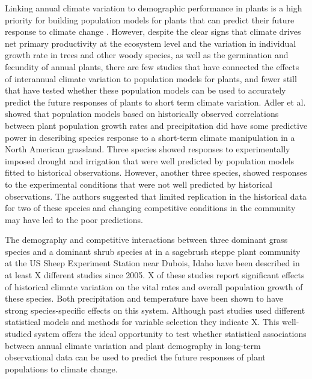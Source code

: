 \documentclass[11pt]{article}
\begin{document}
\begin{doublespacing}
Linking annual climate variation to demographic performance in plants is a high priority for building population models for plants that can predict their future response to climate change \citep{crone_ability_2013,ehrlen_advancing_2016}. However, despite the clear signs that climate drives net primary productivity at the ecosystem level and the variation in individual growth rate in trees and other woody species, as well as the germination and fecundity of annual plants, there are few studies that have connected the effects of interannual climate variation to population models for plants, and fewer still that have tested whether these population models can be used to accurately predict the future responses of plants to short term climate variation. Adler et al. \citep{adler byrn and leiker} showed that population models based on historically observed correlations between plant population growth rates and precipitation did have some predictive power in describing species response to a short-term climate manipulation in a North American grassland. Three species showed responses to experimentally imposed drought and irrigation that were well predicted by population models fitted to historical observations.  However, another three species, showed responses to the experimental conditions that were not well predicted by historical observations.  The authors suggested that limited replication in the historical data for two of these species and changing competitive conditions in the community may have led to the poor predictions.  

The demography and competitive interactions between three dominant grass species and a dominant shrub species at in a sagebrush steppe plant community at the US Sheep Experiment Station near Dubois, Idaho have been described in at least X different studies since 2005. X of these studies report significant effects of historical climate variation on the vital rates and overall population growth of these species. Both precipitation and temperature have been shown to have strong species-specific effects on this system.  Although past studies used different statistical models and methods for variable selection they indicate X.  This well-studied system offers the ideal opportunity to test whether statistical associations between annual climate variation and plant demography in long-term observational data can be used to predict the future responses of plant populations to climate change.  


\end{doublespacing}
\end{document}
